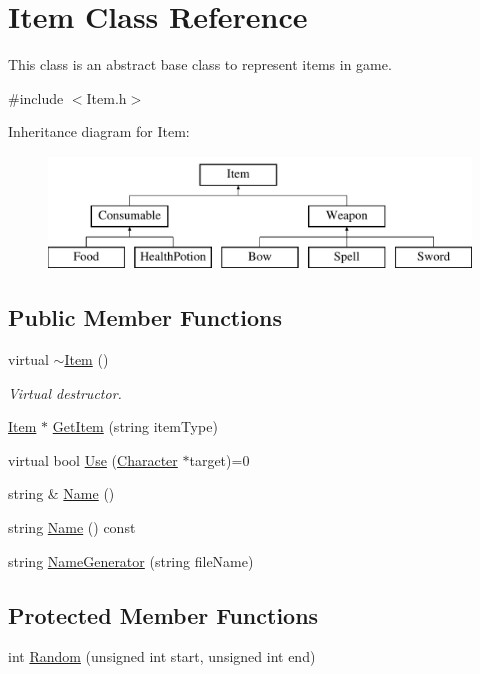 \hypertarget{classItem}{\section{Item Class Reference}
\label{classItem}
}


This class is an abstract base class to represent items in game.  




{\ttfamily \#include $<$Item.\-h$>$}

Inheritance diagram for Item\-:\begin{figure}[H]
\begin{center}
\leavevmode
\includegraphics[height=3.000000cm]{classItem}
\end{center}
\end{figure}
\subsection*{Public Member Functions}
\begin{DoxyCompactItemize}
\item 
virtual \hyperlink{classItem_a33cc9c0bc556b5a33a9d0d58d37c602b}{$\sim$\-Item} ()
\begin{DoxyCompactList}\small\item\em Virtual destructor. \end{DoxyCompactList}\item 
\hyperlink{classItem}{Item} $\ast$ \hyperlink{classItem_a7b17a8ea512b73fff57327dbf64e64fc}{Get\-Item} (string item\-Type)
\item 
virtual bool \hyperlink{classItem_abd3f52dd7fa25d497f2070e95d44ac03}{Use} (\hyperlink{classCharacter}{Character} $\ast$target)=0
\item 
string \& \hyperlink{classItem_a90ce604a697cdd06ed15c1176f269bcf}{Name} ()
\item 
string \hyperlink{classItem_abbe83003b27f50b343ebfb4b89d73a9b}{Name} () const 
\item 
string \hyperlink{classItem_ac97e1c78a4ea877d9c07774f07dd5fa4}{Name\-Generator} (string file\-Name)
\end{DoxyCompactItemize}
\subsection*{Protected Member Functions}
\begin{DoxyCompactItemize}
\item 
int \hyperlink{classItem_a06cbecc4adca069c237a334998679942}{Random} (unsigned int start, unsigned int end)
\end{DoxyCompactItemize}
